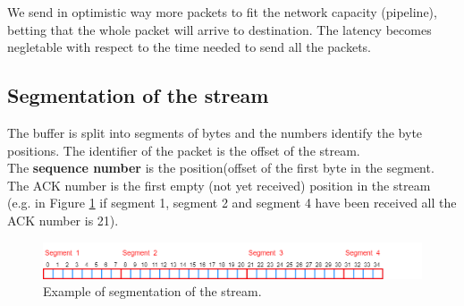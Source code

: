 We send in optimistic way more packets to fit the network capacity (pipeline), betting that the whole packet will arrive to destination. The latency becomes negletable with respect to the time needed to send all the packets.

\subsection{Segmentation of the stream}
The buffer is split into segments of bytes and the numbers identify the byte positions. The identifier of the packet is the offset of the stream.\\
The \textbf{sequence number} is the position(offset of the first byte in the segment. The ACK number is the first empty (not yet received) position in the stream (e.g. in Figure \ref{segmentation} if segment 1, segment 2 and segment 4 have been received all the ACK number is 21).\\

\begin{figure}[H]
\centering\footnotesize
\includegraphics[scale=0.5]{Images/Transport/segmentation}
\caption{Example of segmentation of the stream.}\label{segmentation}
\end{figure}

